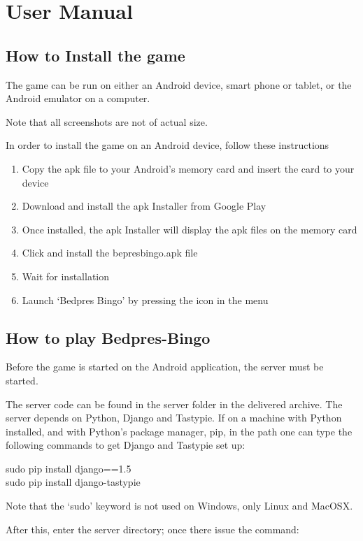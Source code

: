 \section{User Manual}
\label{usermanual}

\subsection{How to Install the game}
The game can be run on either an Android device, smart phone or tablet, or
the Android emulator on a computer.

Note that all screenshots are not of actual size.

In order to install the game on an Android device, follow these instructions
\begin{enumerate}
\item Copy the apk file to your Android's memory card and insert the card to
your device
\item Download and install the apk Installer from Google Play\cite{website:apk}
\item Once installed, the apk Installer will display the apk files on the
memory card
\item Click and install the bepresbingo.apk file
\item Wait for installation 
\item Launch `Bedpres Bingo' by pressing the icon in the menu
\end{enumerate}

\subsection{How to play Bedpres-Bingo}

Before the game is started on the Android application, the server must be started.

The server code can be found in the server folder in the delivered archive. The
server depends on Python, Django and Tastypie. If on a machine with Python installed,
and with Python's package manager, pip, in the path one can type the following commands
to get Django and Tastypie set up:

sudo pip install django==1.5\\
sudo pip install django-tastypie

Note that the `sudo' keyword is not used on Windows, only Linux and MacOSX.

After this, enter the server directory; once there issue the command:

